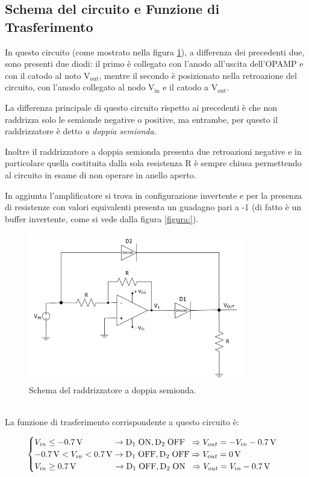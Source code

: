 \documentclass{report}
\begin{document}
\subsection{Schema del circuito e Funzione di Trasferimento}
In questo circuito (come mostrato nella figura \ref{figura:schema3}), a differenza dei precedenti due, sono presenti due diodi: il primo è collegato con l'anodo all'uscita dell'OPAMP e con il catodo al noto $\displaystyle\mathrm{V_{out}}$, mentre il secondo è posizionato nella retroazione del circuito, con l'anodo collegato al nodo $\displaystyle\mathrm{V_{in}}$ e il catodo a $\displaystyle\mathrm{V_{out}}$.\par
La differenza principale di questo circuito rispetto ai precedenti è che non raddrizza solo le semionde negative o positive, ma entrambe, per questo il raddrizzatore è detto \textit{a doppia semionda}. \par
Inoltre il raddrizzatore a doppia semionda presenta due retroazioni negative e in particolare quella costituita dalla sola resistenza R è sempre chiusa permettendo al circuito in esame di non operare in anello aperto.\par %
In aggiunta l'amplificatore si trova in configurazione invertente e per la presenza di resistenze con valori equivalenti presenta un guadagno pari a -1 (di fatto è un buffer invertente, come si vede dalla figura \ref{figura:}). %
\begin{figure}[h]
	\centering
	\includegraphics[height=6.5cm]{immagini/schema3}
	\caption{Schema del raddrizzatore a doppia semionda.}
	\label{figura:schema3}
\end{figure}
\\La funzione di trasferimento corrispondente a questo circuito è:

\begin{equation}
   \begin{cases}
   V_{in}\le \SI{-0.7}{\volt}\;\;\indent\indent\rightarrow \mathrm{D_1\; ON, D_2\;OFF}\;\; \Rightarrow V_{out} = -V_{in}-\SI{0.7}{\volt}\\
  \SI{-0.7}{\volt} < V_{in}< \SI{0.7}{\volt}\rightarrow \mathrm{D_1\; OFF, D_2\;OFF} \Rightarrow V_{out} = \SI{0}{\volt}\\
   V_{in}\ge \SI{0.7}{\volt}\;\;\;\;\;\indent\indent\rightarrow \mathrm{D_1\; OFF, D_2\;ON}\;\; \Rightarrow V_{out} = V_{in}-\SI{0.7}{\volt}
   \end{cases}
\end{equation}
\end{document}
